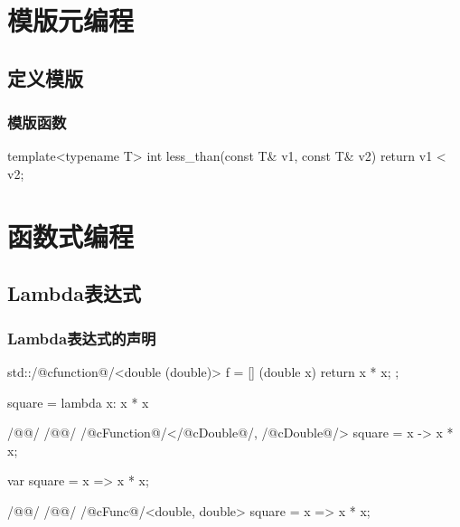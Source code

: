 \documentclass[hidelinks]{ctexart}
\begin{document}


\section{模版元编程} %
\label{sec:模版元编程}

\subsection{定义模版} %
\label{sub:定义模版}

\subsubsection{模版函数} %
\label{ssub:模版函数}

\begin{cpplst}
template<typename T>
int less_than(const T& v1, const T& v2)
{
    return v1 < v2;
}
\end{cpplst}




\section{函数式编程} %
\label{sec:函数式编程}

\subsection{Lambda表达式} %
\label{sub:lambda表达式}

\subsubsection{Lambda表达式的声明} %
\label{ssub:lambda表达式的声明}
\begin{cpplst}
std::/@\+c{function}@/<double (double)> f = 
    [] (double x) { return x * x; };
\end{cpplst}
\begin{pylst}
square = lambda x: x * x
\end{pylst}
\begin{javalst}
/@@/
/@\lhend @/
/@\+c{Function}@/</@\+c{Double}@/, /@\+c{Double}@/> square = x -> x * x;
\end{javalst}
\begin{jslst}
var square = x => x * x;
\end{jslst}
\begin{cshlst}
/@@/
/@\lhend @/
/@\+c{Func}@/<double, double> square = x => x * x;
\end{cshlst}
\end{document}
